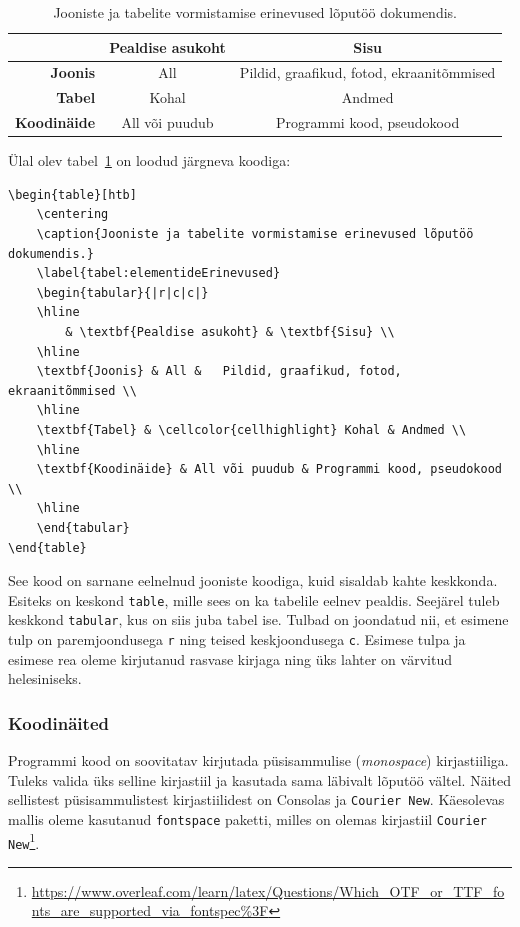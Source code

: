 \begin{table}[htb]
    \centering
    \caption{Jooniste ja tabelite vormistamise erinevused lõputöö dokumendis.}
    \label{tabel:elementideErinevused}
    \begin{tabular}{|r|c|c|}
    \hline
    & \textbf{Pealdise asukoht} & \textbf{Sisu} \\
    \hline
    \textbf{Joonis} & All &   Pildid, graafikud, fotod, ekraanitõmmised \\
    \hline
    \textbf{Tabel} & \cellcolor{cellhighlight} Kohal & Andmed \\
    \hline
    \textbf{Koodinäide} & All või puudub & Programmi kood, pseudokood \\
    \hline
    \end{tabular}
\end{table}

Ülal olev tabel~\ref{tabel:elementideErinevused} on loodud järgneva koodiga:
\begin{verbatim}
\begin{table}[htb]
    \centering
    \caption{Jooniste ja tabelite vormistamise erinevused lõputöö dokumendis.}
    \label{tabel:elementideErinevused}
    \begin{tabular}{|r|c|c|}
    \hline
        & \textbf{Pealdise asukoht} & \textbf{Sisu} \\
    \hline
    \textbf{Joonis} & All &   Pildid, graafikud, fotod, ekraanitõmmised \\
    \hline
    \textbf{Tabel} & \cellcolor{cellhighlight} Kohal & Andmed \\
    \hline
    \textbf{Koodinäide} & All või puudub & Programmi kood, pseudokood \\
    \hline
    \end{tabular}
\end{table}
\end{verbatim}

See kood on sarnane eelnelnud jooniste koodiga, kuid sisaldab kahte keskkonda. Esiteks on keskond \verb|table|, mille sees on ka tabelile eelnev pealdis. Seejärel tuleb keskkond \verb|tabular|, kus on siis juba tabel ise. Tulbad on joondatud nii, et esimene tulp on paremjoondusega \verb|r| ning teised keskjoondusega \verb|c|. Esimese tulpa ja esimese rea oleme kirjutanud rasvase kirjaga ning üks lahter on värvitud helesiniseks.

\subsubsection{Koodinäited}
Programmi kood on soovitatav kirjutada püsisammulise (\emph{monospace}) kirjastiiliga. Tuleks valida üks selline kirjastiil ja kasutada sama läbivalt lõputöö vältel. Näited sellistest püsisammulistest kirjastiilidest on Consolas ja \texttt{Courier New}. Käesolevas mallis oleme kasutanud \verb|fontspace| paketti, milles on olemas kirjastiil \texttt{Courier New}\footnote{\url{https://www.overleaf.com/learn/latex/Questions/Which_OTF_or_TTF_fonts_are_supported_via_fontspec\%3F}}.

